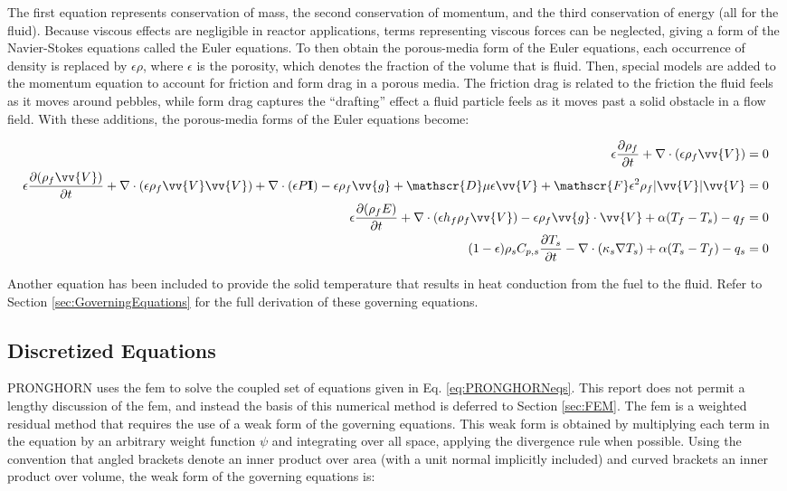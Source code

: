 \documentclass[10pt]{article}
\newcommand{\massconservation}{\epsilon\frac{\partial\rho_f}{\partial t} + \nabla\cdot(\epsilon\rho_f\vv{V})=0} %
\newcommand{\momentumconservation}{\epsilon\frac{\partial(\rho_f\vv{V})}{\partial t}+\nabla\cdot(\epsilon\rho_f\vv{V}\vv{V})+\nabla\cdot(\epsilon P\textbf{I})-\epsilon\rho_f\vv{g}+\mathscr{D}\mu\epsilon\vv{V}+\mathscr{F}\epsilon^2\rho_f|\vv{V}|\vv{V}=0} %
\newcommand{\fluidenergyconservation}{\epsilon\frac{\partial (\rho_f E)}{\partial t}+\nabla\cdot(\epsilon h_f\rho_f\vv{V})-\epsilon\rho_f \vv{g}\cdot\vv{V}+\alpha(T_f-T_s)-q_f=0} %
\newcommand{\solidenergyconservation}{(1-\epsilon)\rho_sC_{p,s}\frac{\partial T_s}{\partial t}-\nabla\cdot(\kappa_s\nabla T_s)+\alpha(T_s-T_f)-q_s=0} %
\numberwithin{equation}{section} %
\begin{document}
The first equation represents conservation of mass, the second conservation of momentum, and the third conservation of energy (all for the fluid). Because viscous effects are negligible in reactor applications, terms representing viscous forces can be neglected, giving a form of the Navier-Stokes equations called the Euler equations. To then obtain the porous-media form of the Euler equations, each occurrence of density is replaced by \(\epsilon\rho\), where \(\epsilon\) is the porosity, which denotes the fraction of the volume that is fluid. Then, special models are added to the momentum equation to account for friction and form drag in a porous media. The friction drag is related to the friction the fluid feels as it moves around pebbles, while form drag captures the ``drafting'' effect a fluid particle feels as it moves past a solid obstacle in a flow field. With these additions, the porous-media forms of the Euler equations become:

\begin{equation}
\label{eq:PRONGHORNeqs}
\begin{aligned}
\massconservation\\
\momentumconservation\\
\fluidenergyconservation\\
\solidenergyconservation\\
\end{aligned}
\end{equation}

Another equation has been included to provide the solid temperature that results in heat conduction from the fuel to the fluid. Refer to Section \ref{sec:GoverningEquations} for the full derivation of these governing equations.

\subsection{Discretized Equations}

PRONGHORN uses the \gls{fem} to solve the coupled set of equations given in Eq. \eqref{eq:PRONGHORNeqs}. This report does not permit a lengthy discussion of the \gls{fem}, and instead the basis of this numerical method is deferred to Section \ref{sec:FEM}. The \gls{fem} is a weighted residual method that requires the use of a weak form of the governing equations. This weak form is obtained by multiplying each term in the equation by an arbitrary weight function \(\psi\) and integrating over all space, applying the divergence rule when possible. Using the convention that angled brackets denote an inner product over area (with a unit normal implicitly included) and curved brackets an inner product over volume, the weak form of the governing equations is:
\end{document}

